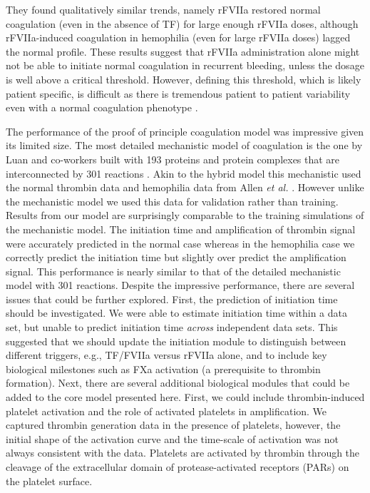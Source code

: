 \documentclass[processes,article,received,moreauthors,pdftex,12pt,a4paper]{mdpi}
\begin{document}
They found qualitatively similar trends, namely rFVIIa restored normal coagulation (even in the absence of TF) for large enough rFVIIa doses, although rFVIIa-induced coagulation 
in hemophilia (even for large rFVIIa doses) lagged the normal profile. 
These results suggest that rFVIIa administration alone
might not be able to initiate normal coagulation in recurrent bleeding, unless the dosage is well above a critical threshold.
However, defining this threshold, which is likely patient specific, is difficult as there is tremendous patient to patient variability even with a normal
coagulation phenotype \citep{Danforth:2012aa}. 

The performance of the proof of principle coagulation model was impressive given its limited size. The most detailed mechanistic model of coagulation is the one by Luan and co-workers built  with 193 proteins and protein complexes that are interconnected by 301 reactions \citep{2010_luan_varner_MolBioSys}. Akin to the hybrid model this mechanistic used the normal thrombin data and hemophilia data from Allen \emph{et al.} \citep{ALLEN2006}. However unlike the mechanistic model we used this data for validation rather than training. Results from our model are surprisingly comparable to the training simulations of the mechanistic model. The initiation time and amplification of thrombin signal were accurately predicted in the normal case whereas in the hemophilia case we correctly predict the initiation time but slightly over predict the amplification signal. This performance is nearly similar to that of the detailed mechanistic model with 301 reactions. Despite the impressive performance, there are several issues that could be further explored. First, the prediction of initiation time should be investigated. 
We were able to estimate initiation time within a data set, but unable to predict initiation time \textit{across} independent data sets. 
This suggested that we should update the initiation module to distinguish between different triggers, e.g., TF/FVIIa versus rFVIIa alone, 
and to include key biological milestones such as FXa activation (a prerequisite to thrombin formation).
Next, there are several additional biological modules that could be added to the core model presented here. 
First, we could include thrombin-induced platelet activation and the role of activated platelets in amplification.
We captured thrombin generation data in the presence of platelets, however,
the initial shape of the activation curve and the time-scale of activation was not always consistent with the data.
Platelets are activated by thrombin through the cleavage of the extracellular domain of protease-activated receptors (PARs) on the platelet surface.
\end{document}
